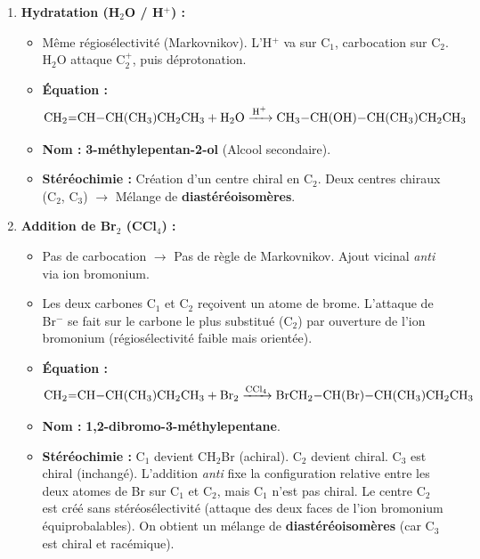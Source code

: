 \documentclass[11pt]{article}
\begin{document}
\begin{exoresolu}
\begin{enumerate}
    \item \textbf{Hydratation (H$_2$O / H$^+$) :}
    \begin{itemize}
        \item Même régiosélectivité (Markovnikov). L'H$^+$ va sur C$_1$, carbocation sur C$_2$. H$_2$O attaque C$_2^+$, puis déprotonation.
        \item \textbf{Équation :} 
        \[ \ce{CH2=CH-CH(CH3)CH2CH3 + H2O ->[H^+] CH3-CH(OH)-CH(CH3)CH2CH3} \]
        \item \textbf{Nom :} \textbf{3-méthylepentan-2-ol} (Alcool secondaire). 
        \item \textbf{Stéréochimie :} Création d'un centre chiral en C$_2$. Deux centres chiraux (C$_2$, C$_3$) $\rightarrow$ Mélange de \textbf{diastéréoisomères}.
    \end{itemize}

    \item \textbf{Addition de Br$_2$ (CCl$_4$) :}
    \begin{itemize}
        \item Pas de carbocation $\rightarrow$ Pas de règle de Markovnikov. Ajout vicinal \textit{anti} via ion bromonium.
        \item Les deux carbones C$_1$ et C$_2$ reçoivent un atome de brome. L'attaque de Br$^-$ se fait sur le carbone le plus substitué (C$_2$) par ouverture de l'ion bromonium (régiosélectivité faible mais orientée).
        \item \textbf{Équation :} 
        \[ \ce{CH2=CH-CH(CH3)CH2CH3 + Br2 ->[CCl4] BrCH2-CH(Br)-CH(CH3)CH2CH3} \]
        \item \textbf{Nom :} \textbf{1,2-dibromo-3-méthylepentane}.
        \item \textbf{Stéréochimie :} C$_1$ devient CH$_2$Br (achiral). C$_2$ devient chiral. C$_3$ est chiral (inchangé). L'addition \textit{anti} fixe la configuration relative entre les deux atomes de Br sur C$_1$ et C$_2$, mais C$_1$ n'est pas chiral. Le centre C$_2$ est créé sans stéréosélectivité (attaque des deux faces de l'ion bromonium équiprobalables). On obtient un mélange de \textbf{diastéréoisomères} (car C$_3$ est chiral et racémique).
    \end{itemize}


\end{enumerate}
\end{exoresolu}
\end{document}
